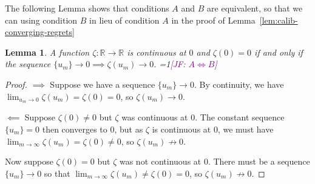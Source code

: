 \documentclass{article}
\newcommand{\Comments}{1}
\newcommand{\mynote}[2]{\ifnum\Comments=1\textcolor{#1}{#2}\fi}
\newcommand{\jessie}[1]{\mynote{purple}{[JF: #1]}}
\newcommand{\reals}{\mathbb{R}}
\newtheorem{lemma}{Lemma}
\begin{document}
The following Lemma shows that conditions $A$ and $B$ are equivalent, so that we can using condition $B$ in lieu of condition $A$ in the proof of Lemma~\ref{lem:calib-converging-regrets}
\begin{lemma}\label{lem:continuous-iff-limits}
	A function $\zeta:\reals \to \reals$ is continuous at $0$ and $\zeta(0) = 0$ if and only if the sequence $\{u_m\} \to 0 \implies \zeta(u_m) \to 0$.
	\jessie{$A \iff B$}
\end{lemma}
\begin{proof}
	$\implies$ Suppose we have a sequence $\{u_m\} \to 0$.
	By continuity, we have $\lim_{u_m \to 0}\zeta(u_m) = \zeta(0) = 0$, so $\zeta(u_m) \to 0$.
	
	$\impliedby$ Suppose $\zeta(0) \neq 0$ but $\zeta$ was continuous at $0$.
	The constant sequence $\{u_m\} = 0$ then converges to $0$, but as $\zeta$ is continuous at $0$, we must have $\lim_{m \to \infty}\zeta(u_m) = \zeta(0) \neq 0$, so $\zeta(u_m) \not \to 0$.
	
	Now suppose $\zeta(0) = 0$ but $\zeta$ was not continuous at $0$.
	There must be a sequence $\{u_m\} \to 0$ so that $\lim_{m \to \infty}\zeta(u_m) \neq \zeta(0) = 0$, so $\zeta(u_m) \not \to 0$.
\end{proof}
\end{document}
